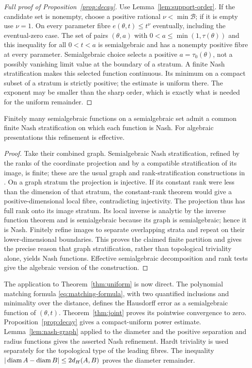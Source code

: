 \begin{proof}[Full proof of Proposition~\ref{prop:decay}]
Use Lemma~\ref{lem:support-order}. If the candidate set is nonempty,
choose a positive rational $\nu<\min\mathcal B$; if it is empty use
$\nu=1$. On every parameter fibre $e(\theta,t)\le t^\nu$ eventually,
including the eventual-zero case. The set of pairs $(\theta,a)$ with
$0<a\le\min(1,\tau(\theta))$ and this inequality for all $0<t<a$
is semialgebraic and has a nonempty positive fibre at every parameter.
Semialgebraic choice selects a positive $a=\tau_0(\theta)$, not a
possibly vanishing limit value at the boundary of a stratum. A finite
Nash stratification makes this selected function continuous. Its minimum
on a compact subset of a stratum is strictly positive; the estimate is
uniform there. The exponent may be smaller than the sharp order, which
is exactly what is needed for the uniform remainder.
\end{proof}

\begin{lemma}\label{lem:nash-graph}
Finitely many semialgebraic functions on a semialgebraic set admit a
common finite Nash stratification on which each function is Nash.
For algebraic presentations this refinement is effective.
\end{lemma}
\begin{proof}
Take their combined graph. Semialgebraic Nash stratification, refined by
the ranks of the coordinate projection and by a compatible stratification
of its image, is finite; these are the usual graph and rank-stratification
constructions in \cite{BCR98,BPR06}. On a graph stratum the projection is
injective. If its constant rank were less than the dimension of that
stratum, the constant-rank theorem would give a positive-dimensional
local fibre, contradicting injectivity. The projection thus has full
rank onto its image stratum. Its local inverse is analytic by the inverse
function theorem and is semialgebraic because its graph is semialgebraic;
hence it is Nash. Finitely refine images to separate overlapping strata
and repeat on their lower-dimensional boundaries. This proves the claimed
finite partition and gives the precise reason that graph stratification,
rather than topological triviality alone, yields Nash functions.
Effective semialgebraic decomposition and rank tests give the algebraic
version of the construction.
\end{proof}

The application to Theorem~\ref{thm:uniform} is now direct. The polynomial
matching formula \eqref{eq:matching-formula}, with two quantified
inclusions and minimality over the distance, defines the Hausdorff error
as a semialgebraic function of $(\theta,t)$. Theorem~\ref{thm:joint}
proves its pointwise convergence to zero. Proposition~\ref{prop:decay}
gives a compact-uniform power estimate. Lemma~\ref{lem:nash-graph}
applied to the diameter and the positive separation and radius functions
gives the asserted Nash refinement. Hardt triviality is used separately
for the topological type of the leading fibres. The inequality
$|\operatorname{diam} A-\operatorname{diam} B|\le2d_H(A,B)$ proves the diameter remainder.

